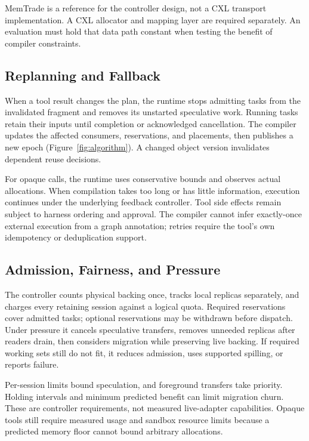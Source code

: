 \documentclass[letterpaper,twocolumn,10pt]{article}
\newcommand{\memtrade}{MemTrade\xspace}
\begin{document}
\memtrade is a reference for the controller design, not a CXL transport
implementation. A CXL allocator and mapping layer are required separately.
An evaluation must hold that data path constant when testing the benefit of
compiler constraints.

\subsection{Replanning and Fallback}

When a tool result changes the plan, the runtime stops admitting tasks from
the invalidated fragment and removes its unstarted speculative work. Running
tasks retain their inputs until completion or acknowledged cancellation.
The compiler updates the affected consumers, reservations, and placements,
then publishes a new epoch (Figure~\ref{fig:algorithm}). A changed object version invalidates dependent
reuse decisions.

For opaque calls, the runtime uses conservative bounds and observes actual
allocations. When compilation takes too long or has little information,
execution continues under the underlying feedback controller. Tool side
effects remain subject to harness ordering and approval. The compiler cannot
infer exactly-once external execution from a graph annotation; retries require
the tool's own idempotency or deduplication support.

\subsection{Admission, Fairness, and Pressure}
\label{sec:admission}

The controller counts physical backing once, tracks local replicas separately,
and charges every retaining session against a logical quota. Required
reservations cover admitted tasks; optional reservations may be withdrawn
before dispatch. Under pressure it cancels speculative transfers, removes
unneeded replicas after readers drain, then considers migration while
preserving live backing. If required working sets still do not fit, it reduces
admission, uses supported spilling, or reports failure.

Per-session limits bound speculation, and foreground transfers take priority.
Holding intervals and minimum predicted benefit can limit migration churn.
These are controller requirements, not measured live-adapter capabilities.
Opaque tools still require measured usage and sandbox resource limits because
a predicted memory floor cannot bound arbitrary allocations.
\end{document}
